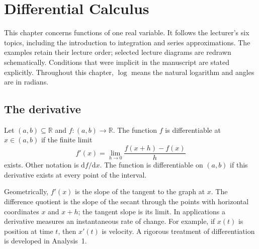 \chapter{Differential Calculus}\label{chap:differential-calculus}

This chapter concerns functions of one real variable. It follows the lecturer's
six topics, including the introduction to integration and series approximations.
The examples retain their lecture order; selected lecture diagrams are redrawn
schematically. Conditions that were implicit in the manuscript are stated explicitly.
Throughout this chapter, $\log$ means the natural logarithm and angles are in radians.

\section{The derivative}

\begin{definition}[Differentiability]
Let $(a,b)\subseteq\mathbb R$ and $f:(a,b)\to\mathbb R$.
The function $f$ is differentiable at $x\in(a,b)$ if the finite limit
\begin{equation}
 f'(x)=\lim_{h\to0}\frac{f(x+h)-f(x)}{h}
 \tag{1}\label{eq:mm-derivative}
\end{equation}
exists. Other notation is $\mathrm df/\mathrm dx$.
The function is differentiable on $(a,b)$ if this derivative exists at every
point of the interval.
\end{definition}

Geometrically, $f'(x)$ is the slope of the tangent to the graph at $x$.
The difference quotient is the slope of the secant through the points with
horizontal coordinates $x$ and $x+h$; the tangent slope is its limit.
In applications a derivative measures an instantaneous rate of change.
For example, if $x(t)$ is position at time $t$, then $x'(t)$ is velocity.
A rigorous treatment of differentiation is developed in Analysis~1.

\begin{center}
\end{center}

